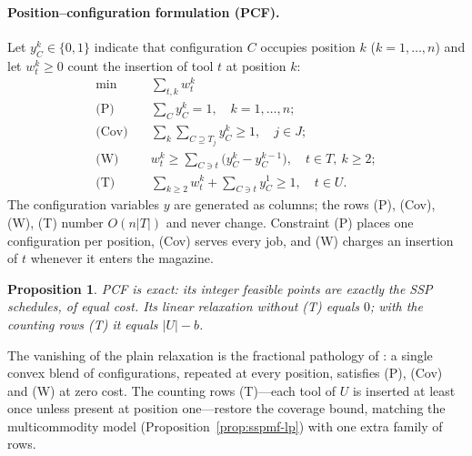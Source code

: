 \documentclass[11pt,a4paper]{article}
\theoremstyle{plain}
\newtheorem{proposition}{Proposition}
\theoremstyle{definition}
\theoremstyle{remark}
\newcommand{\U}{U}
\begin{document}
\paragraph{Position--configuration formulation (PCF).}
Let $y_C^{k}\in\{0,1\}$ indicate that configuration $C$ occupies position $k$
($k=1,\dots,n$) and let $w_t^{k}\ge0$ count the insertion of tool $t$ at position
$k$:
\[
\begin{aligned}
  \min\ & \sum_{t,k} w_t^{k}\\
  \text{(P)}\quad & \sum_{C} y_C^{k}=1, \quad k=1,\dots,n;\\
  \text{(Cov)}\quad & \sum_{k}\sum_{C\supseteq T_j} y_C^{k}\ge1, \quad j\in J;\\
  \text{(W)}\quad & w_t^{k}\ge\sum_{C\ni t}\bigl(y_C^{k}-y_C^{k-1}\bigr),
    \quad t\in T,\ k\ge2;\\
  \text{(T)}\quad & \sum_{k\ge2} w_t^{k}+\sum_{C\ni t} y_C^{1}\ge1, \quad t\in\U.
\end{aligned}
\]
The configuration variables $y$ are generated as columns; the rows
(P), (Cov), (W), (T) number $O(n\lvert T\rvert)$ and never change. Constraint (P)
places one configuration per position, (Cov) serves every job, and (W) charges an
insertion of $t$ whenever it enters the magazine.
\begin{proposition}\label{prop:pcf}
PCF is exact: its integer feasible points are exactly the SSP schedules, of equal
cost. Its linear relaxation \emph{without} (T) equals $0$; \emph{with} the counting
rows (T) it equals $\lvert\U\rvert-b$.
\end{proposition}
\noindent The vanishing of the plain relaxation is the fractional pathology of
\citet{Tang1988}: a single convex blend of configurations, repeated at every
position, satisfies (P), (Cov) and (W) at zero cost. The counting rows (T)---each
tool of $\U$ is inserted at least once unless present at position one---restore the
coverage bound, matching the multicommodity model (Proposition~\ref{prop:sspmf-lp})
with one extra family of rows.
\end{document}

